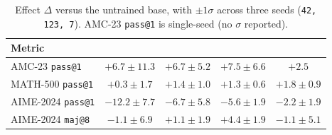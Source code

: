 \begin{table}[t]
\centering\small
\caption{Effect $\Delta$ versus the untrained base, with $\pm 1\sigma$ across
three seeds (\texttt{42, 123, 7}). \armD{} AMC-23 \texttt{pass@1} is
single-seed (no $\sigma$ reported).}
\label{tab:delta}
\begin{tabular}{lcccc}
\toprule
Metric & \armA{} & \armB{} & \armC{} & \armD{} \\
\midrule
AMC-23 \texttt{pass@1}      & $+6.7\pm 11.3$ & $+6.7\pm 5.2$ & $+7.5\pm 6.6$ & $+2.5$ \\
MATH-500 \texttt{pass@1}    & $+0.3\pm 1.7$  & $+1.4\pm 1.0$ & $+1.3\pm 0.6$ & $+1.8\pm 0.9$ \\
AIME-2024 \texttt{pass@1}   & $-12.2\pm 7.7$ & $-6.7\pm 5.8$ & $-5.6\pm 1.9$ & $-2.2\pm 1.9$ \\
AIME-2024 \texttt{maj@8}    & $-1.1\pm 6.9$  & $+1.1\pm 1.9$ & $+4.4\pm 1.9$ & $-1.1\pm 5.1$ \\
\bottomrule
\end{tabular}
\end{table}
